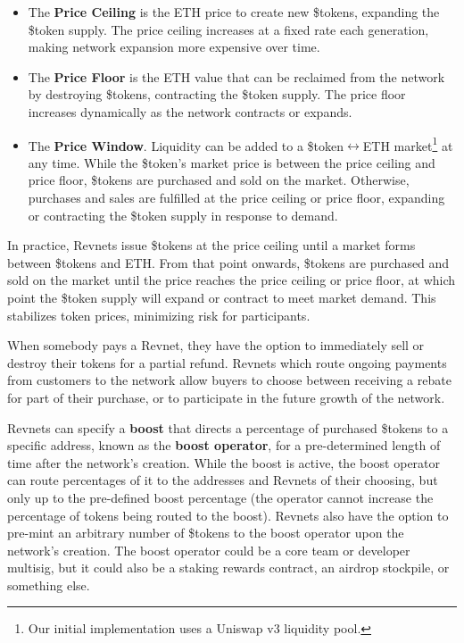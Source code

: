 \documentclass{article}
\begin{document}
\begin{itemize}
  \item The \textbf{Price Ceiling} is the ETH price to create new \$tokens, expanding the \$token supply. The price ceiling increases at a fixed rate each generation, making network expansion more expensive over time.
  \item The \textbf{Price Floor} is the ETH value that can be reclaimed from the network by destroying \$tokens, contracting the \$token supply. The price floor increases dynamically as the network contracts or expands.
  \item The \textbf{Price Window}. Liquidity can be added to a \$token$\leftrightarrow$ETH market\footnote{Our initial implementation uses a Uniswap v3 liquidity pool.} at any time. While the \$token's market price is between the price ceiling and price floor, \$tokens are purchased and sold on the market. Otherwise, purchases and sales are fulfilled at the price ceiling or price floor, expanding or contracting the \$token supply in response to demand.
\end{itemize}

In practice, Revnets issue \$tokens at the price ceiling until a market forms between \$tokens and ETH. From that point onwards, \$tokens are purchased and sold on the market until the price reaches the price ceiling or price floor, at which point the \$token supply will expand or contract to meet market demand. This stabilizes token prices, minimizing risk for participants.

When somebody pays a Revnet, they have the option to immediately sell or destroy their tokens for a partial refund. Revnets which route ongoing payments from customers to the network allow buyers to choose between receiving a rebate for part of their purchase, or to participate in the future growth of the network.

Revnets can specify a \textbf{boost} that directs a percentage of purchased \$tokens to a specific address, known as the \textbf{boost operator}, for a pre-determined length of time after the network's creation. While the boost is active, the boost operator can route percentages of it to the addresses and Revnets of their choosing, but only up to the pre-defined boost percentage (the operator cannot increase the percentage of tokens being routed to the boost). Revnets also have the option to pre-mint an arbitrary number of \$tokens to the boost operator upon the network's creation. The boost operator could be a core team or developer multisig, but it could also be a staking rewards contract, an airdrop stockpile, or something else. 
\end{document}
